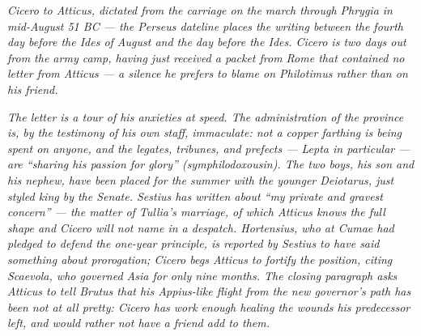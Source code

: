 
\textit{Cicero to Atticus, dictated from the carriage on the
march through Phrygia in mid-August 51 BC --- the Perseus
dateline places the writing between the fourth day before the
Ides of August and the day before the Ides. Cicero is two days
out from the army camp, having just received a packet from Rome
that contained no letter from Atticus --- a silence he prefers to
blame on Philotimus rather than on his friend.}

\textit{The letter is a tour of his anxieties at speed. The
administration of the province is, by the testimony of his own
staff, immaculate: not a copper farthing is being spent on
anyone, and the legates, tribunes, and prefects --- Lepta in
particular --- are ``sharing his passion for glory''
\textit{(symphilodoxousin)}. The two boys, his son and his
nephew, have been placed for the summer with the younger
Deiotarus, just styled king by the Senate. Sestius has written
about ``my private and gravest concern'' --- the matter of
Tullia's marriage, of which Atticus knows the full shape and
Cicero will not name in a despatch. Hortensius, who at Cumae had
pledged to defend the one-year principle, is reported by Sestius
to have said something about prorogation; Cicero begs Atticus to
fortify the position, citing Scaevola, who governed Asia for
only nine months. The closing paragraph asks Atticus to tell
Brutus that his Appius-like flight from the new governor's path
has been not at all pretty: Cicero has work enough healing the
wounds his predecessor left, and would rather not have a friend
add to them.}
